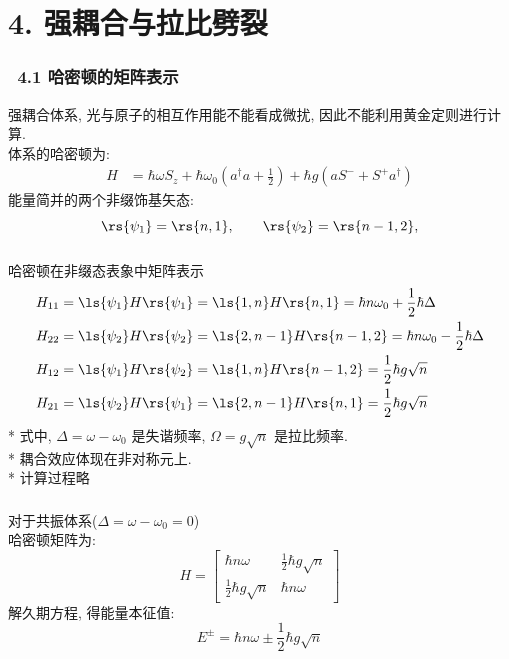 \section{4. 强耦合与拉比劈裂}

\begin{frame} 
\frametitle{~4.1 哈密顿的矩阵表示}
    强耦合体系, 光与原子的相互作用能不能看成微扰, 因此不能利用黄金定则进行计算.  \\ 
    体系的哈密顿为: 
    \[\begin{aligned}
        H &= \hbar \omega S_z + \hbar \omega_0 (a^{\dagger}  a +\frac{1}{2}) + \hbar g ( a S^- + S^+ a ^{\dagger}) 
    \end{aligned} \] 
    能量简并的两个非缀饰基矢态:
    \[ \rs{\psi_1} = \rs{n, 1}, \qquad \rs{\psi_2} =\rs{n-1, 2},  \] 
\end{frame}

\begin{frame} 
\frametitle{}
哈密顿在非缀态表象中矩阵表示
    \[ \begin{aligned}
        H_{11} & =  \ls{\psi_1} H \rs{\psi_1} =  \ls{1,n} H \rs{n, 1} = \hbar n \omega_0 +\frac{1}{2} \hbar \Delta \\
        H_{22} & =  \ls{\psi_2} H \rs{\psi_2} =  \ls{2,n-1} H \rs{n-1, 2} = \hbar n \omega_0 -\frac{1}{2} \hbar \Delta \\
        H_{12} & =  \ls{\psi_1} H \rs{\psi_2} =  \ls{1,n} H \rs{n-1, 2} = \frac{1}{2} \hbar g \sqrt{n} \\
        H_{21} & =  \ls{\psi_2} H \rs{\psi_1} =  \ls{2,n-1} H \rs{n, 1} = \frac{1}{2} \hbar g \sqrt{n} \\ 
    \end{aligned}\]  
* 式中,  $\Delta = \omega -\omega_0 $ 是失谐频率, $\Omega = g \sqrt{n}$ 是拉比频率. \\ 
* 耦合效应体现在非对称元上. \\
* 计算过程略
\end{frame}

\begin{frame} 
\frametitle{}
    对于共振体系($\Delta = \omega -\omega_0 =0 $)\\ 
    哈密顿矩阵为:
    \[ H = \begin{bmatrix}
        \hbar n \omega  & \frac{1}{2} \hbar g \sqrt{n} \\
        \frac{1}{2} \hbar g \sqrt{n} & \hbar n \omega
     \end{bmatrix}\]
    解久期方程, 得能量本征值:
    \[ E^{\pm} = \hbar n \omega \pm \frac{1}{2} \hbar g \sqrt{n} \]
\end{frame}

